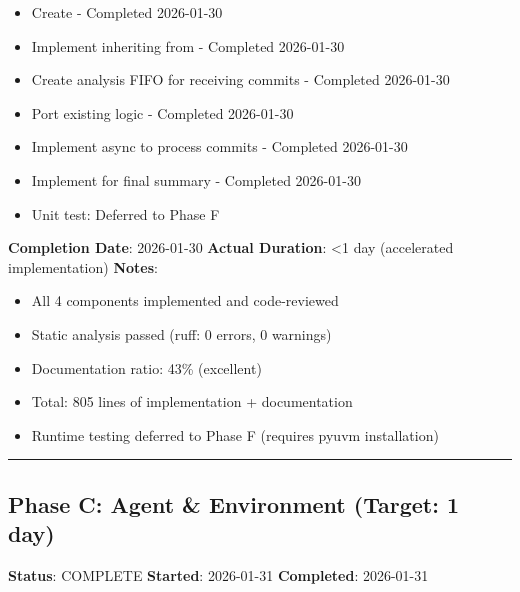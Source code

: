 \begin{record}

\begin{itemize}
\tightlist
\item[$\boxtimes$]
  Create  - Completed
  2026-01-30
\item[$\boxtimes$]
  Implement  inheriting from  -
  Completed 2026-01-30
\item[$\boxtimes$]
  Create analysis FIFO for receiving commits - Completed 2026-01-30
\item[$\boxtimes$]
  Port existing  logic - Completed 2026-01-30
\item[$\boxtimes$]
  Implement async  to process commits - Completed
  2026-01-30
\item[$\boxtimes$]
  Implement  for final summary - Completed
  2026-01-30
\item[$\boxtimes$]
  Unit test: Deferred to Phase F
\end{itemize}

\textbf{Completion Date}: 2026-01-30 \textbf{Actual Duration}:
\textless1 day (accelerated implementation) \textbf{Notes}:

\begin{itemize}
\tightlist
\item
  All 4 components implemented and code-reviewed
\item
  Static analysis passed (ruff: 0 errors, 0 warnings)
\item
  Documentation ratio: 43\% (excellent)
\item
  Total: 805 lines of implementation + documentation
\item
  Runtime testing deferred to Phase F (requires pyuvm installation)
\end{itemize}

\begin{center}\rule{0.5\linewidth}{0.5pt}\end{center}

\end{record}

\subsection{Phase C: Agent \& Environment (Target: 1 day)}\label{cr:status:pyuvm-migration:phase-c-agent-environment-target-1-day}

\begin{record}

\textbf{Status}: \ok{} COMPLETE \textbf{Started}: 2026-01-31
\textbf{Completed}: 2026-01-31

\end{record}

